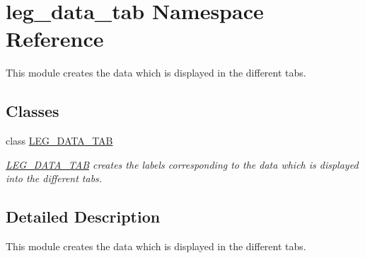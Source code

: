 \hypertarget{namespaceleg__data__tab}{}\section{leg\+\_\+data\+\_\+tab Namespace Reference}
\label{namespaceleg__data__tab}


This module creates the data which is displayed in the different tabs.  


\subsection*{Classes}
\begin{DoxyCompactItemize}
\item 
class \hyperlink{classleg__data__tab_1_1LEG__DATA__TAB}{L\+E\+G\+\_\+\+D\+A\+T\+A\+\_\+\+T\+AB}
\begin{DoxyCompactList}\small\item\em \hyperlink{classleg__data__tab_1_1LEG__DATA__TAB}{L\+E\+G\+\_\+\+D\+A\+T\+A\+\_\+\+T\+AB} creates the labels corresponding to the data which is displayed into the different tabs. \end{DoxyCompactList}\end{DoxyCompactItemize}


\subsection{Detailed Description}
This module creates the data which is displayed in the different tabs. 

